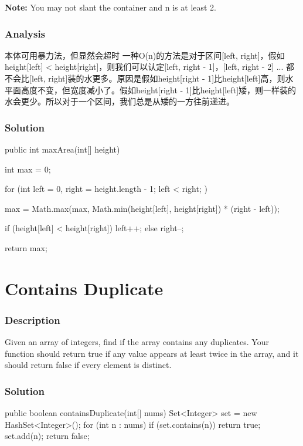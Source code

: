 \textbf{Note:} You may not slant the container and n is at least 2.

\subsubsection{Analysis}
本体可用暴力法，但显然会超时
一种O(n)的方法是对于区间[left, right]，假如height[left] < height[right]，则我们可以认定[left, right - 1]，[left, right - 2] ...
都不会比[left, right]装的水更多。原因是假如height[right - 1]比height[left]高，则水平面高度不变，但宽度减小了。假如height[right - 1]比height[left]矮，则一样装的水会更少。所以对于一个区间，我们总是从矮的一方往前递进。

\subsubsection{Solution}

\begin{Code}
public int maxArea(int[] height) {
    int max = 0;

    for (int left = 0, right = height.length - 1; left < right; ) {
        max = Math.max(max, Math.min(height[left], height[right]) * (right - left));

        if (height[left] < height[right]) {
            left++;
        } else {
            right--;
        }
    }

    return max;
}
\end{Code}

\newpage

\section{Contains Duplicate} %

\subsubsection{Description}
Given an array of integers, find if the array contains any duplicates. Your function should return true if any value appears at least twice in the array, and it should return false if every element is distinct.

\subsubsection{Solution}

\begin{Code}
public boolean containsDuplicate(int[] nums) {
    Set<Integer> set = new HashSet<Integer>();
    for (int n : nums) {
        if (set.contains(n)) {
            return true;
        }
        set.add(n);
    }
    return false;
}
\end{Code}

